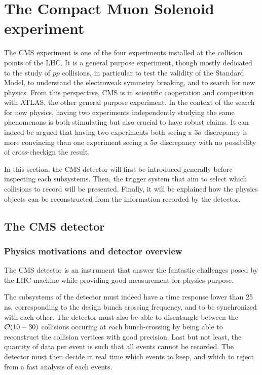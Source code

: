 
    \section{The Compact Muon Solenoid experiment}

        The CMS experiment is one of the four experiments installed at the collision
        points of the LHC. It is a general purpose experiment, though mostly dedicated
        to the study of $pp$ collisions, in particular to test the validity of the Standard
        Model, to understand the electroweak symmetry breaking, and to search for new physics. From this
        perspective, CMS is in scientific cooperation and competition with ATLAS, the
        other general purpose experiment. In the context of the search for new physics,
        having two experiments independently studying the same phenomenons is both
        stimulating but also crucial to have robust claims. It can indeed be
        argued that having two experiments both seeing a $3\sigma$ discrepancy is more
        convincing than one experiment seeing a $5\sigma$ discrepancy with no possibility
        of cross-checkign the result.

        In this section, the CMS detector will first be introduced generally before inspecting
        each subsystems. Then, the trigger system that aim to select which collisions to
        record will be presented. Finally, it will be explained how the physics objects
        can be reconstructed from the information recorded by the detector.

        \subsection{The CMS detector}

            \subsubsection{Physics motivations and detector overview}

        The CMS detector is an instrument that answer the fantastic challenges posed by
        the LHC machine while providing good measurement for physics purpose.

        The subsystems of the detector must indeed have a time response lower than 25 ns,
        corresponding to the design bunch crossing frequency, and to be synchronized with
        each other. The detector must also be able to disentangle between the
        $\mathcal{O}(10-30)$ collisions occuring at each bunch-crossing by being able to
        reconstruct the collision vertices with good precision. Last but not least,
        the quantity of data per event is such that all events cannot be recorded. The
        detector must then decide in real time which events to keep, and which to reject
        from a fast analysis of each events.

